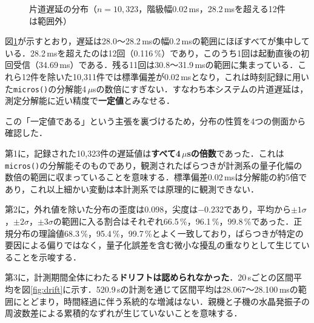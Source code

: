 \documentclass[uplatex,dvipdfmx]{jlreq}
\begin{document}
\begin{figure}[tb]
\begin{center}
\end{center}
\caption{片道遅延の分布（$n=10{,}323$，階級幅0.02\,ms，28.2\,msを超える12件は範囲外）}
\label{fig:hist}
\end{figure}

図\ref{fig:hist}が示すとおり，遅延は28.0〜28.2\,msの幅0.2\,msの範囲にほぼすべてが集中している．28.2\,msを超えたのは12回（0.116\,\%）であり，このうち1回は起動直後の初回受信（34.69\,ms）である．残る11回は30.8〜31.9\,msの範囲に集まっている．これら12件を除いた10{,}311件では標準偏差が0.02\,msとなり，これは時刻記録に用いた\texttt{micros()}の分解能4\,$\mu$sの数倍にすぎない．すなわち本システムの片道遅延は，測定分解能に近い精度で\textbf{一定値}とみなせる．

この「一定値である」という主張を裏づけるため，分布の性質を4つの側面から確認した．

第1に，記録された10{,}323件の遅延値は\textbf{すべて4\,$\mu$sの倍数}であった．これは\texttt{micros()}の分解能そのものであり，観測されたばらつきが計測系の量子化幅の数倍の範囲に収まっていることを意味する．標準偏差0.02\,msは分解能の約5倍であり，これ以上細かい変動は本計測系では原理的に観測できない．

第2に，外れ値を除いた分布の歪度は0.098，尖度は$-0.232$であり，平均から$\pm 1\sigma$，$\pm 2\sigma$，$\pm 3\sigma$の範囲に入る割合はそれぞれ66.5\,\%，96.1\,\%，99.8\,\%であった．正規分布の理論値68.3\,\%，95.4\,\%，99.7\,\%とよく一致しており，ばらつきが特定の要因による偏りではなく，量子化誤差を含む微小な擾乱の重なりとして生じていることを示唆する．

第3に，計測期間全体にわたる\textbf{ドリフトは認められなかった}．20\,sごとの区間平均を図\ref{fig:drift}に示す．520.9\,sの計測を通じて区間平均は28.067〜28.100\,msの範囲にとどまり，時間経過に伴う系統的な増減はない．親機と子機の水晶発振子の周波数差による累積的なずれが生じていないことを意味する．
\end{document}
